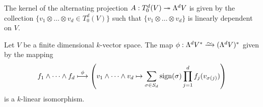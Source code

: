 \begin{corollary}\label{cor:kernel-alternating-projection}
The kernel of the alternating projection \(A: T^d_0(V) \twoheadrightarrow \Lambda^d V\) is
given by the collection \(\{v_{1} \otimes \dots \otimes v_d \in T^d_0(V)\}\)
such that \(\{v_{1} \otimes \dots \otimes v_d\}\) is linearly dependent on
\(V\).
\end{corollary}

\begin{theorem}\label{thm:iso-measure-volume-ext}
Let \(V\) be a finite dimensional \(k\)-vector space. The map \(\phi: \Lambda^d
V^{*} \isoto (\Lambda^dV)^{*}\) given by the mapping
\[
  f_1 \wedge \dots \wedge f_d \overset{\phi}\longmapsto \left(
    v_1 \wedge \dots \wedge v_d \mapsto
    \sum_{\sigma \in S_d} \operatorname{sign}(\sigma) \prod_{j=1}^d f_j(v_{\sigma(j)})
  \right)
\]
is a \(k\)-linear isomorphism.
\end{theorem}

